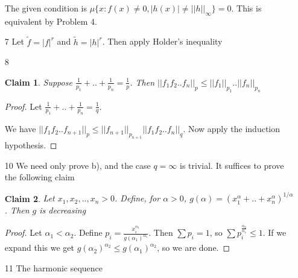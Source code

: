 \documentclass{article}
\newtheorem*{claim}{Claim}
\begin{document}
\begin{itemize}
    The given condition is $\mu\{x:f(x)\neq 0,|h(x)| \neq ||h||_\infty\}=0$. This is equivalent by Problem 4.

    \item[7] Let $\tilde{f}=|f|^r$ and $\tilde{h}=|h|^r$. Then apply Holder's inequality

    \item[8] \begin{claim}
        Suppose $\frac{1}{p_1}+..+\frac{1}{p_n}=\frac{1}{p}$. Then $||f_1f_2..f_n||_p\leq||f_1||_{p_1}..||f_n||_{p_n}$
    \end{claim}

    \begin{proof}
        Let $\frac{1}{p_1}+..+\frac{1}{p_n}=\frac{1}{q}$.
        
        We have $||f_1 f_2..f_{n+1}||_p\leq ||f_{n+1}||_{p_{n+1}}||f_1f_2..f_n||_q$. Now apply the induction hypothesis.
    \end{proof}

    \item[10] We need only prove b), and the case $q=\infty$ is trivial. It suffices to prove the following claim

    \begin{claim}
        Let $x_1,x_2,..,x_n>0$. Define, for $\alpha > 0$, $g(\alpha)=(x_1^\alpha+..+x_n^\alpha)^{1/\alpha}$. Then $g$ is decreasing
    \end{claim}

    \begin{proof}
        Let $\alpha_1 < \alpha_2$. Define $p_i=\frac{x_i^{\alpha_1}}{g(\alpha_1)^{\alpha_1}}$. Then $\sum p_i=1$, so $\sum p_i^\frac{\alpha_2}{\alpha_1}\leq 1$. If we expand this we get $g(\alpha_2)^{\alpha_2}\leq g(\alpha_1)^{\alpha_2}$, so we are done.
    \end{proof}

    \item[11] The harmonic sequence
\end{itemize}
\end{document}
